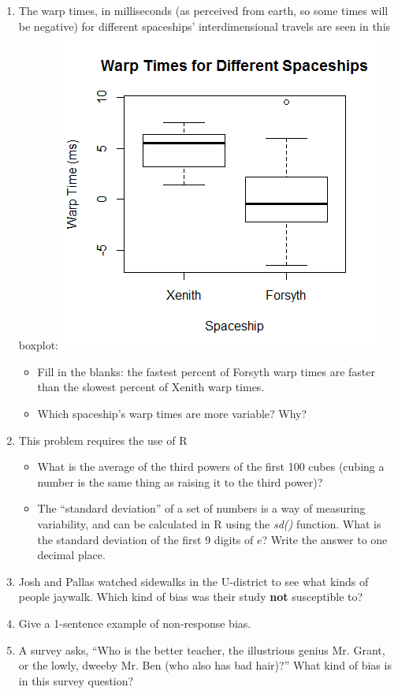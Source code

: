 \documentclass[12pt]{article}
\begin{document}
\begin{enumerate}
	\newpage
	\item The warp times, in milliseconds (as perceived from earth, so some times will be negative) for different spaceships' interdimensional travels are seen in this boxplot: \includegraphics{boxplot}
	\begin{itemize}
		\item Fill in the blanks: the fastest \qquad percent of Forsyth warp times are faster than the slowest \qquad percent of Xenith warp times.
		\item Which spaceship's warp times are more variable? Why?
	\end{itemize}

	\item This problem requires the use of R
	\begin{itemize}
		\item What is the average of the third powers of the first 100 cubes (cubing a number is the same thing as raising it to the third power)?
		\item The ``standard deviation'' of a set of numbers is a way of measuring variability, and can be calculated in R using the \textit{sd()} function. What is the standard deviation of the first 9 digits of $e$? Write the answer to one decimal place.
	\end{itemize}

	\item Josh and Pallas watched sidewalks in the U-district to see what kinds of people jaywalk. Which kind of bias was their study \textbf{not} susceptible to?

	\item Give a 1-sentence example of non-response bias.

	\item A survey asks, ``Who is the better teacher, the illustrious genius Mr. Grant, or the lowly, dweeby Mr. Ben (who also has bad hair)?'' What kind of bias is in this survey question?

\end{enumerate}	
\end{document}
